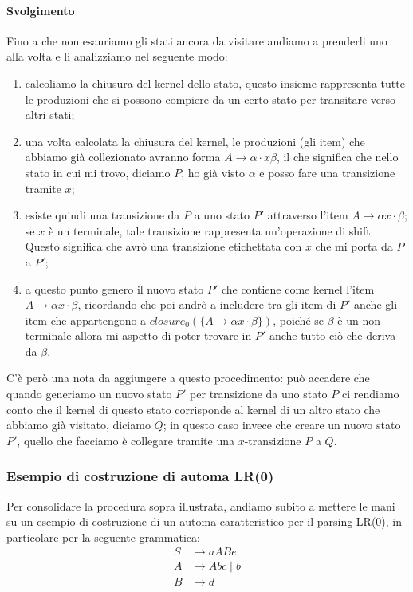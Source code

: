 \documentclass[class=book, crop=false, oneside, 12pt]{standalone}
\begin{document}
\paragraph{Svolgimento}
Fino a che non esauriamo gli stati ancora da visitare andiamo a prenderli uno alla volta e li analizziamo nel seguente modo:
\begin{enumerate}
    \item calcoliamo la chiusura del kernel dello stato, questo insieme rappresenta tutte le produzioni che si possono compiere da un certo stato per transitare verso altri stati;
    \item una volta calcolata la chiusura del kernel, le produzioni (gli item) che abbiamo già collezionato avranno forma \(A \to \alpha \cdot x \beta\), il che significa che nello stato in cui mi trovo, diciamo \(P\), ho già visto \(\alpha\) e posso fare una transizione tramite \(x\);
    \item esiste quindi una transizione da \(P\) a uno stato \(P'\) attraverso l'item \(A \to \alpha x \cdot \beta\); se \(x\) è un terminale, tale transizione rappresenta un'operazione di shift. Questo significa che avrò una transizione etichettata con \(x\) che mi porta da \(P\) a \(P'\);
    \item a questo punto genero il nuovo stato \(P'\) che contiene come kernel l'item \(A \to \alpha x \cdot \beta\), ricordando che poi andrò a includere tra gli item di \(P'\) anche gli item che appartengono a \(closure_0 (\{ A \to \alpha x \cdot \beta \})\), poiché se \(\beta\) è un non-terminale allora mi aspetto di poter trovare in \(P'\) anche tutto ciò che deriva da \(\beta\).
\end{enumerate}
C'è però una nota da aggiungere a questo procedimento: può accadere che quando generiamo un nuovo stato \(P'\) per transizione da uno stato \(P\) ci rendiamo conto che il kernel di questo stato corrisponde al kernel di un altro stato che abbiamo già visitato, diciamo \(Q\); in questo caso invece che creare un nuovo stato \(P'\), quello che facciamo è collegare tramite una \(x\)-transizione \(P\) a \(Q\).

\subsubsection{Esempio di costruzione di automa LR(0)}
\label{subsubsec:esercizio_costruzione_automa_lr0}
Per consolidare la procedura sopra illustrata, andiamo subito a mettere le mani su un esempio di costruzione di un automa caratteristico per il parsing LR(0), in particolare per la seguente grammatica:
\begin{align*}
    S &\to aABe \\
    A &\to Abc \mid b \\
    B &\to d
\end{align*}
\end{document}
